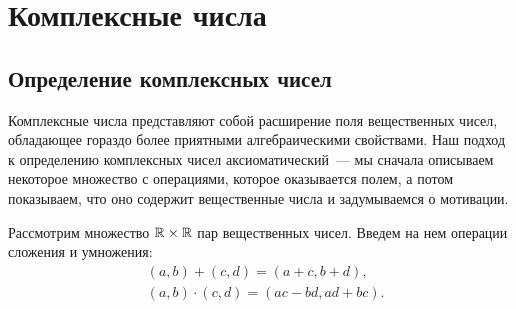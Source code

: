 \section{Комплексные числа}

\subsection{Определение комплексных чисел}


Комплексные числа представляют собой расширение поля вещественных
чисел, обладающее гораздо более приятными алгебраическими
свойствами. Наш подход к определению комплексных чисел
аксиоматический~--- мы сначала описываем некоторое множество с
операциями, которое оказывается полем, а потом показываем, что оно
содержит вещественные числа и задумываемся о мотивации.

\begin{definition}\label{def_complex}
Рассмотрим множество $\mathbb R\times\mathbb R$ пар вещественных чисел.
Введем на нем операции сложения и умножения:
\begin{align*}
&(a,b)+(c,d)=(a+c,b+d),\\
&(a,b)\cdot (c,d)=(ac-bd,ad+bc).
\end{align*}
\end{definition}


